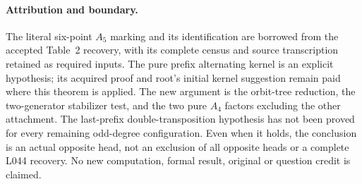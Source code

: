 \documentclass[11pt,a4paper]{article}
\begin{document}
\paragraph{Attribution and boundary.}
The literal six-point $A_5$ marking and its identification are
borrowed from the accepted Table~2 recovery, with its complete
census and source transcription retained as required inputs.
The pure prefix alternating kernel is an explicit hypothesis;
its acquired proof and root's initial kernel suggestion remain
paid where this theorem is applied. The new argument is the
orbit-tree reduction, the two-generator stabilizer test, and
the two pure $A_4$ factors excluding the other attachment.
The last-prefix double-transposition hypothesis has not been
proved for every remaining odd-degree configuration. Even when
it holds, the conclusion is an actual opposite head, not an
exclusion of all opposite heads or a complete L044 recovery.
No new computation, formal result, original or question credit
is claimed.
\end{document}
